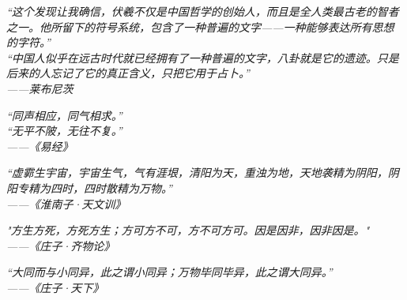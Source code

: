 \begin{titlepage}
\begin{center}
\vspace{0.1cm}

\begin{center}
\itshape
“这个发现让我确信，伏羲不仅是中国哲学的创始人，而且是全人类最古老的智者之一。他所留下的符号系统，包含了一种普遍的文字——一种能够表达所有思想的字符。” \\[0.2cm]
“中国人似乎在远古时代就已经拥有了一种普遍的文字，八卦就是它的遗迹。只是后来的人忘记了它的真正含义，只把它用于占卜。” \\[0.2cm]
——莱布尼茨
\end{center}

\vspace{0.1cm}

\begin{center}
\itshape
“同声相应，同气相求。” \\[0.2cm]
“无平不陂，无往不复。” \\[0.2cm]
——《易经》
\end{center}

\vspace{0.1cm}

\begin{center}
\itshape
“虚霩生宇宙，宇宙生气，气有涯垠，清阳为天，重浊为地，天地袭精为阴阳，阴阳专精为四时，四时散精为万物。” \\[0.2cm]
——《淮南子·天文训》
\end{center}

\vspace{0.1cm}

\begin{center}
\itshape
"方生方死，方死方生；方可方不可，方不可方可。因是因非，因非因是。" \\[0.2cm]
——《庄子·齐物论》
\end{center}

\begin{center}
\itshape
“大同而与小同异，此之谓小同异；万物毕同毕异，此之谓大同异。” \\[0.2cm]
——《庄子·天下》
\end{center}

\vfill
\end{center}
\end{titlepage}

\cleardoublepage

